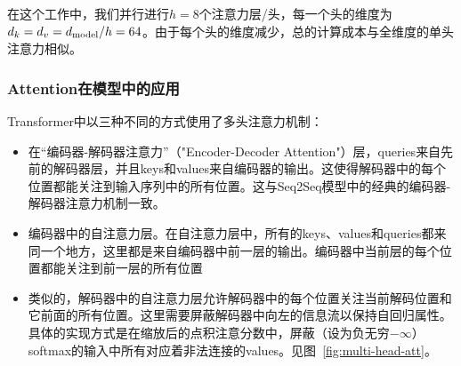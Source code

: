 在这个工作中，我们并行进行$h=8$个注意力层/头，每一个头的维度为$d_k=d_v=d_{\text{model}}/h=64$。由于每个头的维度减少，总的计算成本与全维度的单头注意力相似。

\subsubsection{Attention在模型中的应用}

Transformer中以三种不同的方式使用了多头注意力机制：
\begin{itemize}
 \item 在“编码器-解码器注意力”（"Encoder-Decoder Attention"）层，queries来自先前的解码器层，并且keys和values来自编码器的输出。这使得解码器中的每个位置都能关注到输入序列中的所有位置。这与Seq2Seq模型中的经典的编码器-解码器注意力机制一致\citep{wu2016google, bahdanau2014neural,JonasFaceNet2017}。

 \item 编码器中的自注意力层。在自注意力层中，所有的keys、values和queries都来同一个地方，这里都是来自编码器中前一层的输出。编码器中当前层的每个位置都能关注到前一层的所有位置

 \item 类似的，解码器中的自注意力层允许解码器中的每个位置关注当前解码位置和它前面的所有位置。这里需要屏蔽解码器中向左的信息流以保持自回归属性。具体的实现方式是在缩放后的点积注意分数中，屏蔽（设为负无穷$-\infty$）softmax的输入中所有对应着非法连接的values。见图~\ref{fig:multi-head-att}。

\end{itemize}

